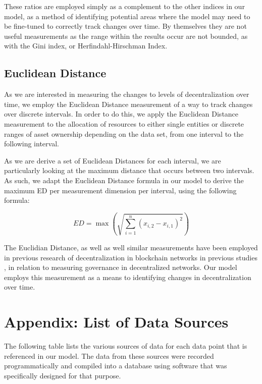 \documentclass[conference]{IEEEtran}
\begin{document}
These ratios are employed simply as a complement to the other indices in our model, as a method of identifying potential areas where the model may need to be fine-tuned to correctly track changes over time.  By themselves they are not useful measurements as the range within the results occur are not bounded, as with the Gini index, or Herfindahl-Hirschman Index.

\subsection{Euclidean Distance}

As we are interested in measuring the changes to levels of decentralization over time, we employ the Euclidean Distance measurement of a way to track changes over discrete intervals.  In order to do this, we apply the Euclidean Distance measurement to the allocation of resources to either single entities or discrete ranges of asset ownership depending on the data set, from one interval to the following interval.

As we are derive a set of Euclidean Distances for each interval, we are particularly looking at the maximum distance that occurs between two intervals.  As such, we adapt the Euclidean Distance formula in our model to derive the maximum ED per measurement dimension per interval, using the following formula:

\[ED = \max \left( \sqrt{\sum_{i=1}^{n} (x_{i,2} - x_{i,1})^2} \right)
\]

The Euclidian Distance, as well as well similar measurements have been employed in previous research of decentralization in blockchain networks in previous studies \cite{gochhayat2020measuring}, in relation to measuring governance in decentralized networks. Our model employs this measurement as a means to identifying changes in decentralization over time.

\vspace{12pt}

\printbibliography

\newpage

\onecolumn

\section{Appendix: List of Data Sources}

\vspace{12pt}

The following table lists the various sources of data for each data point that is referenced in our model.  The data from these sources were recorded programmatically and compiled into a database using software that was specifically designed for that purpose.
\end{document}
